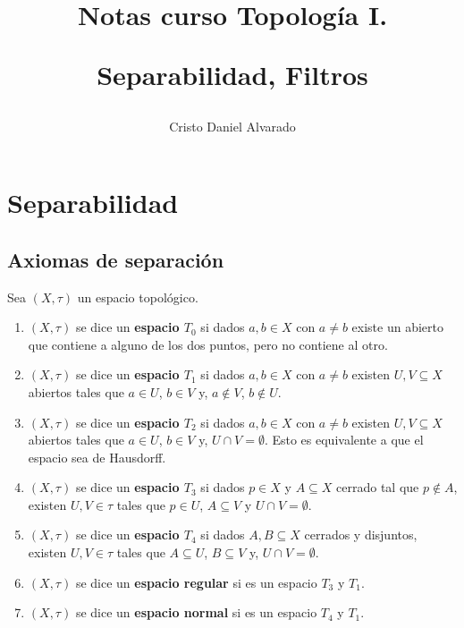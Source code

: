 \documentclass[12pt]{report}
\theoremstyle{largebreak}
\begin{document}
    \setlength{\parskip}{5pt} %
    \setlength{\parindent}{12pt} %
    \title{Notas curso Topología I.
    
    Separabilidad, Filtros}
    \author{Cristo Daniel Alvarado}
    \maketitle

    \tableofcontents %

    \setcounter{chapter}{1} %
    
    \chapter{Separabilidad}
    
    \section{Axiomas de separación}

    \begin{mydef}
        Sea $(X,\tau)$ un espacio topológico.
        \begin{enumerate}
            \item $(X,\tau)$ se dice un \textbf{espacio $T_0$} si dados $a,b\in X$ con $a\neq b$ existe un abierto que contiene a alguno de los dos puntos, pero no contiene al otro.
            \item $(X,\tau)$ se dice un \textbf{espacio $T_1$} si dados $a,b\in X$ con $a\neq b$ existen $U,V\subseteq X$ abiertos tales que $a\in U$, $b\in V$ y, $a\notin V$, $b\notin U$.
            \item $(X,\tau)$ se dice un \textbf{espacio $T_2$} si dados $a,b\in X$ con $a\neq b$ existen $U,V\subseteq X$ abiertos tales que $a\in U$, $b\in V$ y, $U\cap V=\emptyset$. Esto es equivalente a que el espacio sea de Hausdorff.
            \item $(X,\tau)$ se dice un \textbf{espacio $T_3$} si dados $p\in X$ y $A\subseteq X$ cerrado tal que $p\notin A$, existen $U,V\in\tau$ tales que $p\in U$, $A\subseteq V$ y $U\cap V=\emptyset$.
            \item $(X,\tau)$ se dice un \textbf{espacio $T_4$} si dados $A,B\subseteq X$ cerrados y disjuntos, existen $U,V\in\tau$ tales que $A\subseteq U$, $B\subseteq V$ y, $U\cap V=\emptyset$.
            \item $(X,\tau)$ se dice un \textbf{espacio regular} si es un espacio $T_3$ y $T_1$.
            \item $(X,\tau)$ se dice un \textbf{espacio normal} si es un espacio $T_4$ y $T_1$.
        \end{enumerate}
    \end{mydef}
\end{document}
